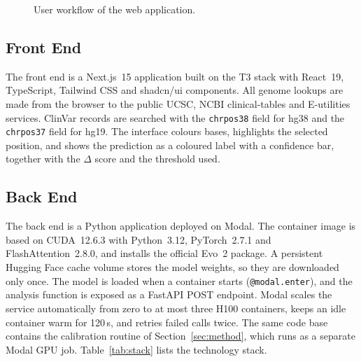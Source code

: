 \documentclass[conference,a4paper]{IEEEtran}
\begin{document}
\begin{figure}[!t]
\centering
{}
\caption{User workflow of the web application.}
\label{fig:flow}
\end{figure}

\subsection{Front End}
The front end is a Next.js~15 application built on the T3 stack with React~19, TypeScript, Tailwind CSS and shadcn/ui components. All genome lookups are made from the browser to the public UCSC, NCBI clinical-tables and E-utilities services. ClinVar records are searched with the \texttt{chrpos38} field for hg38 and the \texttt{chrpos37} field for hg19. The interface colours bases, highlights the selected position, and shows the prediction as a coloured label with a confidence bar, together with the $\Delta$ score and the threshold used.

\subsection{Back End}
The back end is a Python application deployed on Modal. The container image is based on CUDA~12.6.3 with Python~3.12, PyTorch~2.7.1 and FlashAttention~2.8.0, and installs the official Evo~2 package. A persistent Hugging Face cache volume stores the model weights, so they are downloaded only once. The model is loaded when a container starts (\texttt{@modal.enter}), and the analysis function is exposed as a FastAPI POST endpoint. Modal scales the service automatically from zero to at most three H100 containers, keeps an idle container warm for 120\,s, and retries failed calls twice. The same code base contains the calibration routine of Section~\ref{sec:method}, which runs as a separate Modal GPU job. Table~\ref{tab:stack} lists the technology stack.
\end{document}
